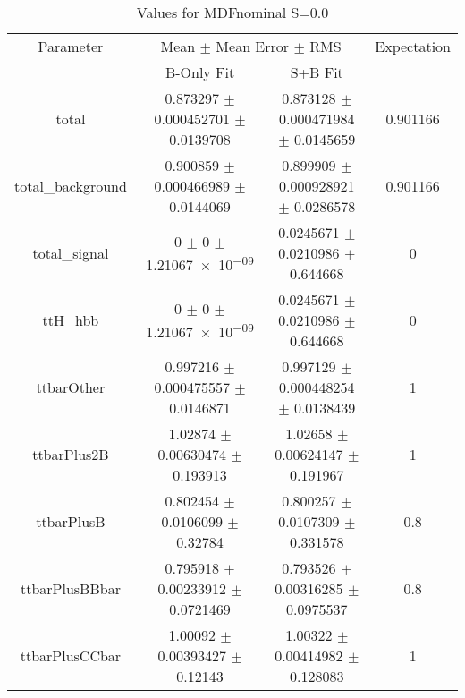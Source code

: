 \begin{table}
\centering
\caption{Values for MDFnominal S=0.0}
\begin{tabular}{cccc}
\toprule
Parameter & \multicolumn{2}{c}{Mean $\pm$ Mean Error $\pm$ RMS} & Expectation\\
 & B-Only Fit & S+B Fit & \\
\midrule
total & \num{0.873297} $\pm$ \num{0.000452701} $\pm$ \num{0.0139708} & \num{0.873128} $\pm$ \num{0.000471984} $\pm$ \num{0.0145659} & \num{0.901166}\\
total\_background & \num{0.900859} $\pm$ \num{0.000466989} $\pm$ \num{0.0144069} & \num{0.899909} $\pm$ \num{0.000928921} $\pm$ \num{0.0286578} & \num{0.901166}\\
total\_signal & \num{0} $\pm$ \num{0} $\pm$ \num{1.21067e-09} & \num{0.0245671} $\pm$ \num{0.0210986} $\pm$ \num{0.644668} & \num{0}\\
ttH\_hbb & \num{0} $\pm$ \num{0} $\pm$ \num{1.21067e-09} & \num{0.0245671} $\pm$ \num{0.0210986} $\pm$ \num{0.644668} & \num{0}\\
ttbarOther & \num{0.997216} $\pm$ \num{0.000475557} $\pm$ \num{0.0146871} & \num{0.997129} $\pm$ \num{0.000448254} $\pm$ \num{0.0138439} & \num{1}\\
ttbarPlus2B & \num{1.02874} $\pm$ \num{0.00630474} $\pm$ \num{0.193913} & \num{1.02658} $\pm$ \num{0.00624147} $\pm$ \num{0.191967} & \num{1}\\
ttbarPlusB & \num{0.802454} $\pm$ \num{0.0106099} $\pm$ \num{0.32784} & \num{0.800257} $\pm$ \num{0.0107309} $\pm$ \num{0.331578} & \num{0.8}\\
ttbarPlusBBbar & \num{0.795918} $\pm$ \num{0.00233912} $\pm$ \num{0.0721469} & \num{0.793526} $\pm$ \num{0.00316285} $\pm$ \num{0.0975537} & \num{0.8}\\
ttbarPlusCCbar & \num{1.00092} $\pm$ \num{0.00393427} $\pm$ \num{0.12143} & \num{1.00322} $\pm$ \num{0.00414982} $\pm$ \num{0.128083} & \num{1}\\
\bottomrule
\end{tabular}
\end{table}